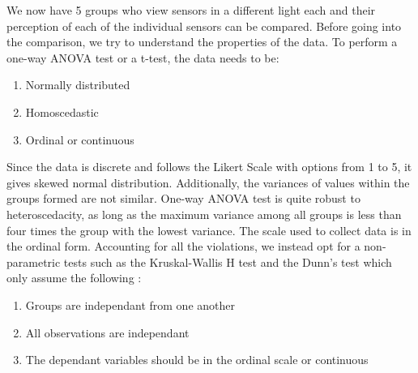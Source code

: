 We now have 5 groups who view sensors in a different light each and their perception of each of the individual sensors can be compared. Before going into the comparison, we try to understand the properties of the data. To perform a one-way ANOVA test or a t-test, the data needs to be:

\begin{enumerate}
\item Normally distributed
\item Homoscedastic
\item Ordinal or continuous
\end{enumerate}

Since the data is discrete and follows the Likert Scale with options from 1 to 5, it gives skewed normal distribution. Additionally, the variances of values within the groups formed are not similar. One-way ANOVA test is quite robust to heteroscedacity, as long as the maximum variance among all groups is less than four times the group with the lowest variance. The scale used to collect data is in the ordinal form. Accounting for all the violations, we instead opt for a non-parametric tests such as the Kruskal-Wallis H test and the Dunn's test
which only assume the following : 

\begin{enumerate}
\item Groups are independant from one another
\item All observations are independant
\item The dependant variables should be in the ordinal scale or continuous
\end{enumerate}

